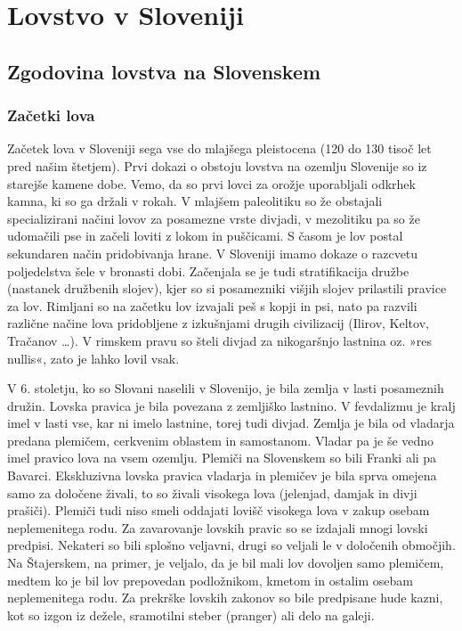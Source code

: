 \documentclass[a4paper,12pt,openright]{book}
\begin{document}
\chapter{Lovstvo v Sloveniji}
\label{zgodovina}

\section{Zgodovina lovstva na Slovenskem}

\subsection{Začetki lova}

Začetek lova v Sloveniji sega vse do mlajšega pleistocena (120 do 130 tisoč let pred našim štetjem). 
Prvi dokazi o obstoju lovstva na ozemlju Slovenije so iz starejše kamene dobe. Vemo, da so prvi lovci za orožje uporabljali odkrhek kamna, ki so ga držali v rokah. 
V mlajšem paleolitiku so že obstajali specializirani načini lovov za posamezne vrste divjadi, v mezolitiku pa so že udomačili pse in začeli loviti z lokom in puščicami. 
S časom je lov postal sekundaren način pridobivanja hrane. 
V Sloveniji imamo dokaze o razcvetu poljedelstva šele v bronasti dobi. Začenjala se je tudi stratifikacija družbe (nastanek družbenih slojev), kjer so si posamezniki višjih slojev prilastili pravice za lov. 
Rimljani so na začetku lov izvajali peš s kopji in psi, nato pa razvili različne načine lova pridobljene z izkušnjami drugih civilizacij (Ilirov, Keltov, Tračanov …). 
V rimskem pravu so šteli divjad za nikogaršnjo lastnina oz. »res nullis«, zato je lahko lovil vsak.\cite{Lov_8_14}

V 6. stoletju, ko so Slovani naselili v Slovenijo, je bila zemlja v lasti posameznih družin. 
Lovska pravica je bila povezana z zemljiško lastnino. 
V fevdalizmu je kralj imel v lasti vse, kar ni imelo lastnine, torej tudi divjad. Zemlja je bila od vladarja predana plemičem, cerkvenim oblastem in samostanom. 
Vladar pa je še vedno imel pravico lova na vsem ozemlju. Plemiči na Slovenskem so bili Franki ali pa Bavarci. 
Ekskluzivna lovska pravica vladarja in plemičev je bila sprva omejena samo za določene živali, to so živali visokega lova (jelenjad, damjak in divji prašiči). 
Plemiči tudi niso smeli oddajati lovišč visokega lova v zakup osebam neplemenitega rodu. Za zavarovanje lovskih pravic so se izdajali mnogi lovski predpisi. 
Nekateri so bili splošno veljavni, drugi so veljali le v določenih območjih. 
Na Štajerskem, na primer, je veljalo, da je bil mali lov dovoljen samo plemičem, medtem ko je bil lov prepovedan podložnikom, kmetom in ostalim osebam neplemenitega rodu. 
Za prekrške lovskih zakonov so bile predpisane hude kazni, kot so izgon iz dežele, sramotilni steber (pranger) ali delo na galeji.\cite{Lov_15_34}
\end{document}
